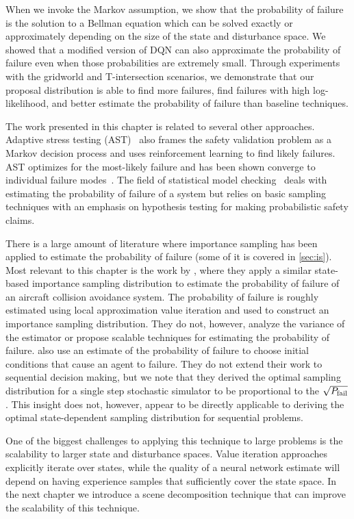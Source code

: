 When we invoke the Markov assumption, we show that the probability of failure is the solution to a Bellman equation which can be solved exactly or approximately depending on the size of the state and disturbance space. We showed that a modified version of DQN can also approximate the probability of failure even when those probabilities are extremely small. Through experiments with the gridworld and T-intersection scenarios, we demonstrate that our proposal distribution is able to find more failures, find failures with high log-likelihood, and better estimate the probability of failure than baseline techniques. 

The work presented in this chapter is related to several other approaches. Adaptive stress testing (AST)~\cite{lee2015adaptive,koren2018adaptive,corso2019adaptive,koren2019efficient} also frames the safety validation problem as a Markov decision process and uses reinforcement learning to find likely failures. AST optimizes for the most-likely failure and has been shown converge to individual failure modes~\cite{corso2019adaptive}. The field of statistical model checking~\cite{agha2018survey} deals with estimating the probability of failure of a system but relies on basic sampling techniques with an emphasis on hypothesis testing for making probabilistic safety claims.

There is a large amount of literature where importance sampling has been applied to estimate the probability of failure (some of it is covered in \cref{sec:is}). Most relevant to this chapter is the work by \textcite{Chryssanthacopoulos2010}, where they apply a similar state-based importance sampling distribution to estimate the probability of failure of an aircraft collision avoidance system. The probability of failure is roughly estimated using local approximation value iteration and used to construct an importance sampling distribution. They do not, however, analyze the variance of the estimator or propose scalable techniques for estimating the probability of failure.  \textcite{uesato2019rigorous} also use an estimate of the probability of failure to choose initial conditions that cause an agent to failure. They do not extend their work to sequential decision making, but we note that they derived the optimal sampling distribution for a single step stochastic simulator to be proportional to the $\sqrt{P_{\rm fail}}$. This insight does not, however, appear to be directly applicable to deriving the optimal state-dependent sampling distribution for sequential problems.

One of the biggest challenges to applying this technique to large problems is the scalability to larger state and disturbance spaces. Value iteration approaches explicitly iterate over states, while the quality of a neural network estimate will depend on having experience samples that sufficiently cover the state space. In the next chapter we introduce a scene decomposition technique that can improve the scalability of this technique. 